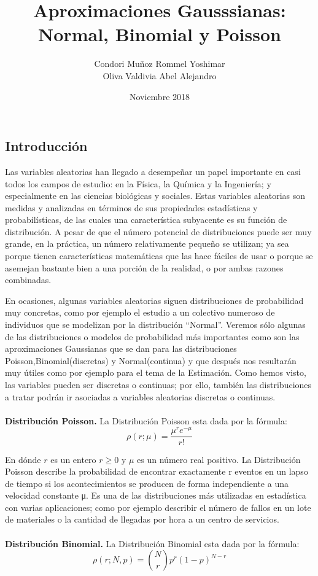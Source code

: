 \documentclass[12pt,a4paper]{article}
\title{Aproximaciones Gausssianas:\\Normal, Binomial y Poisson}
\author{Condori Muñoz Rommel Yoshimar\\Oliva Valdivia Abel Alejandro}
\date{Noviembre 2018}
\begin{document}
\maketitle
\begin{multicols}{2}
\section{Introducción}
    Las variables aleatorias han llegado a desempeñar un papel importante en casi todos los campos de estudio: en la Física, la Química y la Ingeniería; y especialmente en las ciencias biológicas y sociales. Estas variables aleatorias son medidas y analizadas en términos de sus propiedades estadísticas y probabilísticas, de las cuales una característica subyacente es su función de distribución. A pesar de que el número potencial de distribuciones puede ser muy grande, en la práctica, un número relativamente pequeño se utilizan; ya sea porque tienen características matemáticas que las hace fáciles de usar o porque se asemejan bastante bien a una porción de la realidad, o por ambas razones combinadas.
    
    En ocasiones, algunas variables aleatorias siguen distribuciones de probabilidad muy concretas, como por ejemplo el estudio a un colectivo numeroso de individuos que se modelizan por la distribución “Normal”. Veremos sólo algunas de las distribuciones o modelos de probabilidad más importantes como son las aproximaciones Gaussianas que se dan para las distribuciones Poisson,Binomial(discretas) y Normal(continua)   y que después nos resultarán muy útiles como por ejemplo para el tema de la Estimación.
    Como hemos visto, las variables pueden ser discretas o continuas; por ello, también las distribuciones a tratar podrán ir asociadas a variables aleatorias discretas o continuas.\\
    \\ \textbf{Distribución Poisson.} La Distribución Poisson esta dada por la fórmula:
    $$\rho(r;\mu)=\frac{\mu^re^{-\mu}}{r!}$$
    
    En dónde $r$ es un entero $r\geq0$ y $\mu$ es un número real positivo. La Distribución Poisson describe la probabilidad de encontrar exactamente r eventos en un lapso de tiempo si los acontecimientos se producen de forma independiente a una velocidad constante μ. Es una de las distribuciones más utilizadas en estadística con varias aplicaciones; como por ejemplo describir el número de fallos en un lote de materiales o la cantidad de llegadas por hora a un centro de servicios.\\\\
    \textbf{Distribución Binomial.} La Distribución Binomial esta dada por la fórmula: 
    $$\rho(r;N,p)={N \choose r}p^r(1-p)^{N-r}$$
    

\end{multicols}
\end{document}
